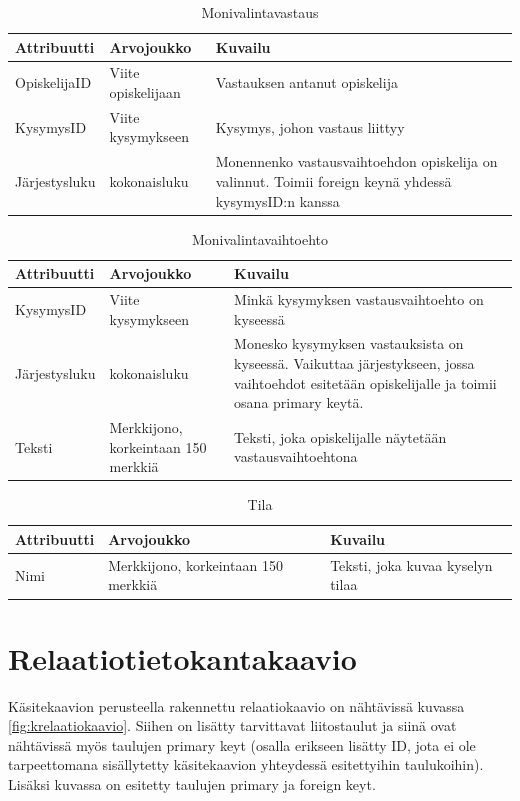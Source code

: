 \documentclass[12pt,a4paper,titlepage]{article}
\begin{document}
\begin{table}[h]
\caption{Monivalintavastaus}
\begin{tabularx}{\textwidth}{ |  l X X  |}
  \hline
  Attribuutti & Arvojoukko & Kuvailu \\
  \hline
  OpiskelijaID & Viite opiskelijaan & Vastauksen antanut opiskelija \\
  KysymysID & Viite kysymykseen & Kysymys, johon vastaus liittyy \\
  Järjestysluku & kokonaisluku & Monennenko vastausvaihtoehdon opiskelija on valinnut. Toimii foreign keynä yhdessä kysymysID:n kanssa \\
  \hline
\end{tabularx}
\end{table}

\begin{table}[h]
\caption{Monivalintavaihtoehto}
\begin{tabularx}{\textwidth}{ |  l X X  |}
  \hline
  Attribuutti & Arvojoukko & Kuvailu \\
  \hline
  KysymysID & Viite kysymykseen & Minkä kysymyksen vastausvaihtoehto on kyseessä \\
  Järjestysluku & kokonaisluku & Monesko kysymyksen vastauksista on kyseessä. Vaikuttaa järjestykseen, jossa vaihtoehdot esitetään opiskelijalle ja toimii osana primary keytä. \\
  Teksti & Merkkijono, korkeintaan 150 merkkiä & Teksti, joka opiskelijalle näytetään vastausvaihtoehtona \\
  \hline
\end{tabularx}
\end{table}

\begin{table}[h]
\caption{Tila} \label{tietokohde_viimeinen}
\begin{tabularx}{\textwidth}{ |  l X X  |}
  \hline
  Attribuutti & Arvojoukko & Kuvailu \\
  \hline
  Nimi & Merkkijono, korkeintaan 150 merkkiä & Teksti, joka kuvaa kyselyn tilaa\\
  \hline
\end{tabularx}
\end{table}

\section{Relaatiotietokantakaavio}
Käsitekaavion perusteella rakennettu relaatiokaavio on nähtävissä kuvassa \ref{fig:krelaatiokaavio}. Siihen on lisätty tarvittavat liitostaulut ja siinä ovat nähtävissä myös taulujen primary keyt (osalla erikseen lisätty ID, jota ei ole tarpeettomana sisällytetty käsitekaavion yhteydessä esitettyihin taulukoihin). Lisäksi kuvassa on esitetty taulujen primary ja foreign keyt.
\end{document}
